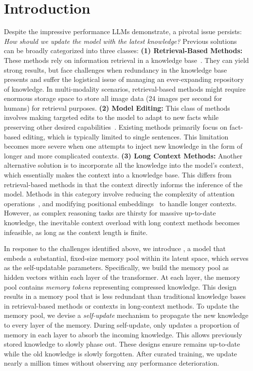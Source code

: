 \section{Introduction}
\label{sec:introduction}
Despite the impressive performance LLMs demonstrate, a pivotal issue persists: \emph{How should we update the model with the latest knowledge?} Previous solutions can be broadly categorized into three classes: 
\textbf{(1) Retrieval-Based Methods:} These methods rely on information retrieval in a knowledge base~\citep{kNNLM,MemoryBank}. They can yield strong results, but face challenges when redundancy in the knowledge base presents and suffer the logistical issue of managing an ever-expanding repository of knowledge. 
In multi-modality scenarios, retrieval-based methods might require enormous storage space to store all image data (24 images per second for humans) for retrieval purposes. 
\textbf{(2) Model Editing:} This class of methods involves making targeted edits to the model to adapt to new facts while preserving other desired capabilities~\citep{LLMEditing}. Existing methods primarily focus on fact-based editing, which is typically limited to single sentences. 
This limitation becomes more severe when one attempts to inject new knowledge in the form of longer and more complicated contexts. 
\textbf{(3) Long Context Methods:} Another alternative solution is to incorporate all the knowledge into the model's context,  
which essentially makes the context into a knowledge base. 
This differs from retrieval-based methods in that the context directly informs the inference of the model. Methods in this category involve reducing the complexity of attention operations~\citep{SparserTransformer, longformer, linformer}, and modifying positional embeddings~\citep{alibi, lextransformer} to handle longer contexts. However, as complex reasoning tasks are thirsty for massive up-to-date knowledge, the inevitable context overload with long context methods becomes infeasible, as long as the context length is finite.


In response to the challenges identified above, we introduce \ours, a model that embeds a substantial, fixed-size memory pool within its latent space, which serves as the self-updatable parameters.
Specifically, we build the memory pool as hidden vectors within each 
layer of the transformer. 
At each layer, the memory pool contains \textit{memory tokens} representing compressed knowledge.
This design results in a memory pool that is less redundant than traditional knowledge bases in retrieval-based methods or contexts in long-context methods.
To update the memory pool, we devise a \textit{self-update} mechanism to propagate the new knowledge to every layer of the memory. During self-update, 
\ours only updates a proportion of memory in each layer to absorb the incoming knowledge. This allows previously stored knowledge to slowly phase out. 
These designs ensure \ours remains up-to-date while the old knowledge is slowly forgotten. 
After curated training, we update \ours nearly a million times without observing any performance deterioration.


